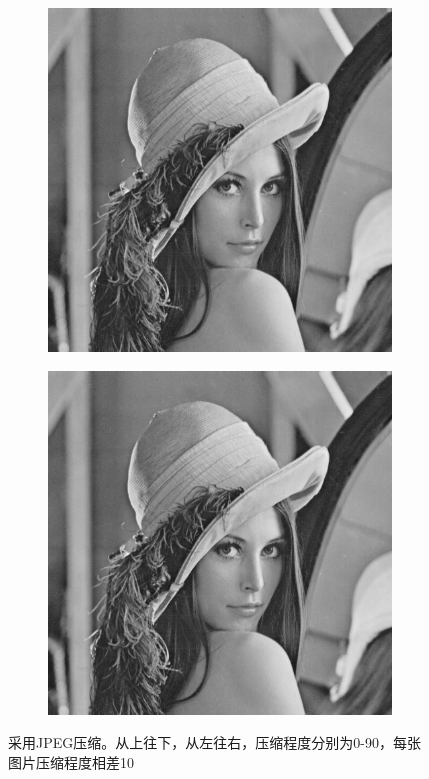 \documentclass{article}
\begin{document}
\begin{figure}[htbp]
\begin{subfigure}{.19\textwidth}
    \end{subfigure}
    \begin{subfigure}{.19\textwidth}
        \includegraphics[width=\linewidth]{img/jpeg/80.jpg}
    \end{subfigure}
    \begin{subfigure}{.19\textwidth}
        \includegraphics[width=\linewidth]{img/jpeg/90.jpg}
    \end{subfigure}
    \caption{采用JPEG压缩。从上往下，从左往右，压缩程度分别为0-90，每张图片压缩程度相差10}
    \label{jpeg}
\end{figure}
\end{document}

